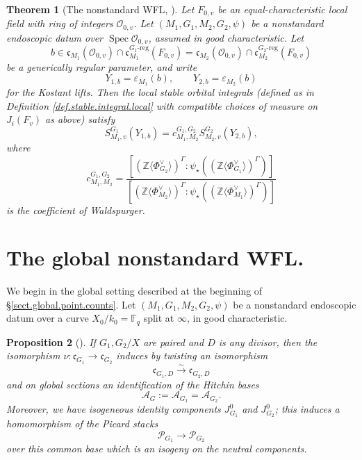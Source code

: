 \documentclass[openany]{amsbook}
\newtheorem{theorem}{Theorem}[chapter]
\newtheorem{proposition}[theorem]{Proposition}
\theoremstyle{definition}
\theoremstyle{remark}
\numberwithin{equation}{section}
\newcommand{\Z}{\mathbb{Z}}
\newcommand{\F}{\mathbb{F}}
\renewcommand{\O}{\mathcal{O}}
\newcommand{\cA}{\mathcal{A}}
\newcommand{\cP}{\mathcal{P}}
\renewcommand{\epsilon}{\varepsilon}
\renewcommand{\-}{\operatorname{-}}
\newcommand{\Spec}{\operatorname{Spec}}
\newcommand{\fc}{\mathfrak{c}}
\begin{document}
\begin{theorem}[{The nonstandard WFL, \cite[Conjecture 3.7]{WaldTordu}}]\label{thm.nonstd.WFL}
    Let $F_{0,v}$ be an equal-characteristic local field with ring of integers $\O_{0,v}$. Let $(M_1, G_1, M_2, G_2, \psi)$ be a nonstandard endoscopic datum over $\Spec \O_{0,v}$, assumed in good characteristic. Let $$b \in \fc_{M_1}(\O_{0,v}) \cap \fc_{M_1}^{G_1\text{-reg}}(F_{0,v}) = \fc_{M_2}(\O_{0,v}) \cap \fc_{M_2}^{G_2\text{-reg}}(F_{0,v})$$ be a generically regular parameter, and write
    $$
        Y_{1,b} = \epsilon_{M_1}(b), \qquad Y_{2,b} = \epsilon_{M_2}(b)
    $$
    for the Kostant lifts. Then the local stable orbital integrals (defined as in Definition \ref{def.stable.integral.local} with compatible choices of measure on $J_i(F_v)$ as above) satisfy
    $$
        S_{M_1, v}^{G_1}(Y_{1,b}) = c_{M_1, M_2}^{G_1, G_2} S_{M_2, v}^{G_2}(Y_{2,b}),
    $$
    where 
    $$
        c_{M_1, M_2}^{G_1, G_2} = \frac{[(\Z \langle \Phi_{G_2}^\vee \rangle)^{\Gamma} : \psi_\star((\Z \langle \Phi_{G_1}^\vee \rangle)^{\Gamma})]}{[(\Z \langle \Phi_{M_2}^\vee \rangle)^{\Gamma} : \psi_\star((\Z \langle \Phi_{M_1}^\vee \rangle)^{\Gamma})]}
    $$
    is the coefficient of Waldspurger.
\end{theorem}










\section{The global nonstandard WFL.}\label{subsect.nonstd.global}

We begin in the global setting described at the beginning of \S \ref{sect.global.point.counts}. Let $(M_1, G_1, M_2, G_2, \psi)$ be a nonstandard endoscopic datum over a curve $X_0/k_0 =\F_q$ split at $\infty$, in good characteristic.

\begin{proposition}[{\cite[\S 4.18, Proposition 4.18.1]{ngofl}}]\label{prop.nonstd.same.chevalley.lie.torus}
    If $G_1, G_2/X$ are paired and $D$ is any divisor, then the isomorphism $\nu : \fc_{G_1} \to \fc_{G_2}$ induces by twisting an isomorphism
    $$
        \fc_{G_1,D} \xrightarrow{\sim} \fc_{G_2,D}
    $$
    and on global sections an identification of the Hitchin bases
    $$
        \cA_G := \cA_{G_1} = \cA_{G_2}.
    $$
    Moreover, we have isogeneous identity components $J_{G_1}^0$ and $J_{G_2}^0$; this induces a homomorphism of the Picard stacks
    $$
        \cP_{G_1} \longrightarrow \cP_{G_2}
    $$
    over this common base which is an isogeny on the neutral components. 
\end{proposition}
\end{document}
